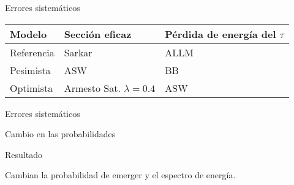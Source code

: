 \begin{frame}{Errores sistem\'aticos}
	\begin{block}{}
		\begin{center}
			\hspace{2mm}
		\end{center}
	\end{block}
	\begin{exampleblock}{}
		\begin{center}
			\begin{tabular}{|l|l|l|}
			\hline
			\textbf{Modelo}      & Secci\'on eficaz& P\'erdida de energ\'ia del $\tau$ \\ 
			\hline
			Referencia &    Sarkar     & ALLM\\ 
			Pesimista &  ASW &     BB\\ 
			Optimista &   Armesto Sat. $\lambda=0.4$&  ASW\\
			\hline 
			\end{tabular}  
		\end{center}
	\end{exampleblock}
\end{frame}

\begin{frame}{Errores sistem\'aticos}
	\begin{block}{Cambio en las probabilidades}
		\begin{center}
		\end{center}
	\end{block}
	\begin{exampleblock}{Resultado}
		\begin{center}
			Cambian la probabilidad de emerger y el espectro de energ\'ia.
		\end{center}
	\end{exampleblock}
\end{frame}

